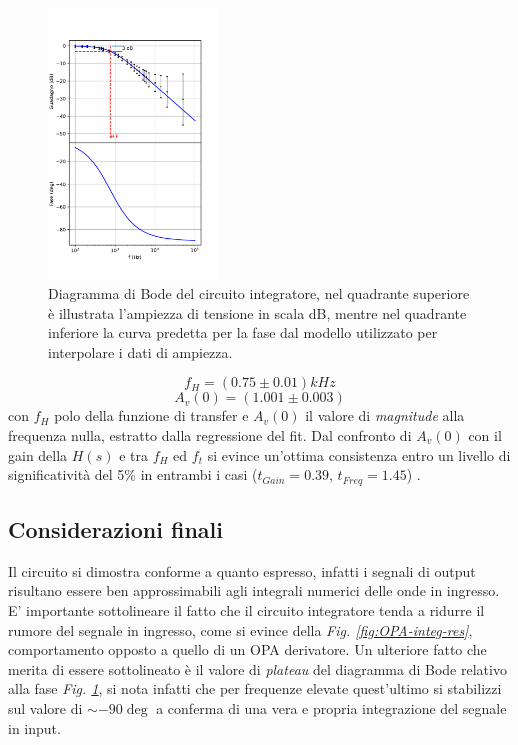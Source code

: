 \documentclass[journal]{IEEEtran}
\begin{document}
\begin{figure}[H]%
\begin{center}
\includegraphics[width=0.40\textwidth]{analysis/output/OPA-integrator_bode(mag+phase).pdf}
\caption{Diagramma di Bode del circuito integratore, nel quadrante superiore è illustrata l'ampiezza di tensione in scala dB, mentre nel quadrante inferiore la curva predetta per la fase dal modello utilizzato per interpolare i dati di ampiezza.}
\label{fig:integ-bode}
\end{center}
\end{figure}
\[f_H = (0.75 \pm 0.01) kHz\]
\[A_v(0) = (1.001 \pm 0.003)\]
con $f_H$ polo della funzione di transfer e $A_v(0)$ il valore di \textit{magnitude} alla frequenza nulla, estratto dalla regressione del fit.
Dal confronto di $A_v(0)$ con il gain della $H(s)$ e tra $f_H$ ed $f_t$ si evince un'ottima consistenza entro un livello di significatività del 5\% in entrambi i casi ($t_{Gain} = 0.39 $, $t_{Freq} = 1.45 $) .
\subsection{\textbf{Considerazioni finali}}
Il circuito si dimostra conforme a quanto espresso, infatti i segnali di output risultano essere ben approssimabili agli integrali numerici delle onde in ingresso. E' importante sottolineare il fatto che il circuito integratore tenda a ridurre il rumore del segnale in ingresso, come si evince della \textit{Fig. \ref{fig:OPA-integ-res}}, comportamento opposto a quello di un OPA derivatore. Un ulteriore fatto che merita di essere sottolineato è il valore di \textit{plateau} del diagramma di Bode relativo alla fase \textit{Fig. \ref{fig:integ-bode}}, si nota infatti che per frequenze elevate quest'ultimo si stabilizzi sul valore di $\sim -90 \deg$ a conferma di una vera e propria integrazione del segnale in input.   
\end{document}
